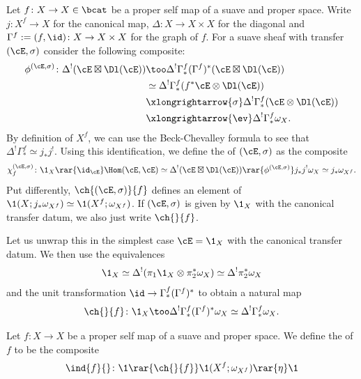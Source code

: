 \begin{cons}
  Let $f\colon X\to X\in \bcat$ be a proper self map of a suave and proper space.
  Write $j\colon X^{f}\to X$ for the canonical map, $\Delta\colon X \to X\times X$ for the diagonal and
  $\Gamma^{f}:=(f,\id)\colon X \to X\times X$ for the graph of $f$. For a suave sheaf with transfer
  $(\cE, \sigma)$ consider the following composite:
  \begin{align*}
    \phi^{(\cE,\sigma)}\colon\Delta^{!}(\cE \boxtimes \Dl(\cE)) &\too \Delta^{!}\Gamma^{f}_{\ast}(\Gamma^{f})^{\ast}(\cE \boxtimes \Dl(\cE))\\
    &\simeq \Delta^{!}\Gamma^{f}_{\ast}(f^{\ast}\cE \otimes \Dl(\cE))\\
    &\xlongrightarrow{\sigma} \Delta^{!}\Gamma^{f}_{\ast}(\cE \otimes \Dl(\cE))\\
    &\xlongrightarrow{\ev} \Delta^{!}\Gamma^{f}_{\ast}\omega_{X}.
  \end{align*}
  By definition of $X^{f}$, we can use the Beck-Chevalley formula to see that
  $\Delta^{!}\Gamma^{f}_{\ast}\simeq j_{\ast}j^{!}$. Using this identification, we define the
   of $(\cE,\sigma)$ as the composite
  \[ \chi_{f}^{(\cE,\sigma)}\colon\1_{X}\rar{\id_{\cE}}\Hom(\cE,\cE)\simeq \Delta^{!}(\cE \boxtimes \Dl(\cE)) \rar{\phi^{(\cE,\sigma)}} j_{\ast}j^{!}\omega_{X}\simeq j_{\ast}\omega_{X^{f}}.\]
  Put differently, $\ch{(\cE,\sigma)}{f}$ defines an element of
  $\1(X;j_{\ast}\omega_{X^{f}})\simeq \1(X^{f};\omega_{X^{f}})$. If $(\cE,\sigma)$ is given by $\1_{X}$ with
  the canonical transfer datum, we also just write $\ch{}{f}$.
\end{cons}

Let us unwrap this in the simplest case $\cE=\1_{X}$ with the canonical transfer
datum. We then use the equivalences
\[\1_{X}\simeq \Delta^{!}(\pi_{1}\1_{X}\otimes \pi_{2}^{\ast}\omega_{X})
  \simeq \Delta^{!}\pi_{2}^{\ast}\omega_{X}\]
and the unit transformation $\id \to \Gamma_{\ast}^{f}(\Gamma^{f})^{\ast}$ to obtain a natural
map
\[ \ch{}{f}\colon\1_{X} \too \Delta^{!}\Gamma^{f}_{\ast}(\Gamma^{f})^{\ast}\omega_{X}\simeq \Delta^{!}\Gamma^{f}_{\ast}\omega_{X}.\]

\begin{defn}\label{defn: index}
  Let $f\colon X\to X$ be a proper self map of a suave and proper space. We define
  the  of $f$ to be the composite
  \[ \ind{f}{}\colon \1 \rar{\ch{}{f}} \1(X^{f};\omega_{X^{f}})\rar{\eta}\1\]
\end{defn}


